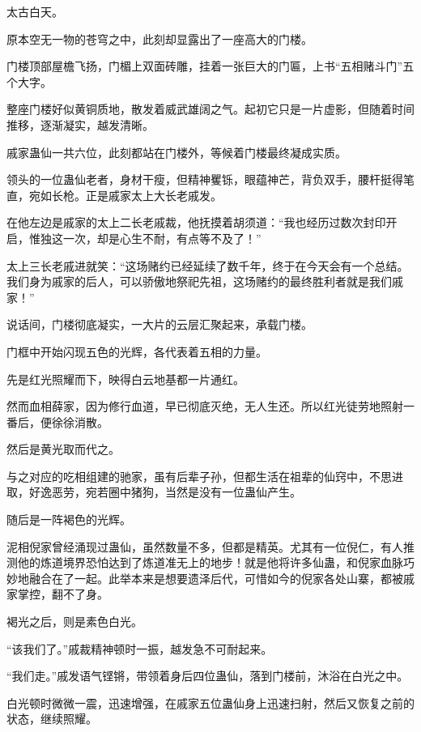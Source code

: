 
\begin{this_body}

太古白天。

原本空无一物的苍穹之中，此刻却显露出了一座高大的门楼。

门楼顶部屋檐飞扬，门楣上双面砖雕，挂着一张巨大的门匾，上书“五相赌斗门”五个大字。

整座门楼好似黄铜质地，散发着威武雄阔之气。起初它只是一片虚影，但随着时间推移，逐渐凝实，越发清晰。

戚家蛊仙一共六位，此刻都站在门楼外，等候着门楼最终凝成实质。

领头的一位蛊仙老者，身材干瘦，但精神矍铄，眼蕴神芒，背负双手，腰杆挺得笔直，宛如长枪。正是戚家太上大长老戚发。

在他左边是戚家的太上二长老戚裁，他抚摸着胡须道：“我也经历过数次封印开启，惟独这一次，却是心生不耐，有点等不及了！”

太上三长老戚进就笑：“这场赌约已经延续了数千年，终于在今天会有一个总结。我们身为戚家的后人，可以骄傲地祭祀先祖，这场赌约的最终胜利者就是我们戚家！”

说话间，门楼彻底凝实，一大片的云层汇聚起来，承载门楼。

门框中开始闪现五色的光辉，各代表着五相的力量。

先是红光照耀而下，映得白云地基都一片通红。

然而血相薛家，因为修行血道，早已彻底灭绝，无人生还。所以红光徒劳地照射一番后，便徐徐消散。

然后是黄光取而代之。

与之对应的吃相组建的驰家，虽有后辈子孙，但都生活在祖辈的仙窍中，不思进取，好逸恶劳，宛若圈中猪狗，当然是没有一位蛊仙产生。

随后是一阵褐色的光辉。

泥相倪家曾经涌现过蛊仙，虽然数量不多，但都是精英。尤其有一位倪仁，有人推测他的炼道境界恐怕达到了炼道准无上的地步！就是他将许多仙蛊，和倪家血脉巧妙地融合在了一起。此举本来是想要遗泽后代，可惜如今的倪家各处山寨，都被戚家掌控，翻不了身。

褐光之后，则是素色白光。

“该我们了。”戚裁精神顿时一振，越发急不可耐起来。

“我们走。”戚发语气铿锵，带领着身后四位蛊仙，落到门楼前，沐浴在白光之中。

白光顿时微微一震，迅速增强，在戚家五位蛊仙身上迅速扫射，然后又恢复之前的状态，继续照耀。


\end{this_body}
